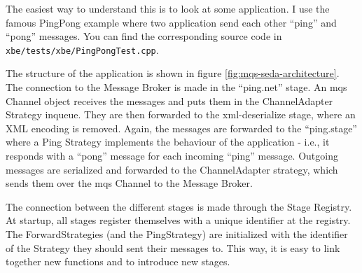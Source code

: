 \documentclass[11pt]{article}
\begin{document}
The easiest way to understand this is to look at some application. I
use the famous PingPong example where two application send each other
"`ping"' and "`pong"' messages. You can find the corresponding source
code in \verb|xbe/tests/xbe/PingPongTest.cpp|. 

The structure of the application is shown in figure
\ref{fig:mqs-seda-architecture}. The connection to the Message Broker is
made in the "`ping.net"' stage. An mqs Channel object receives the
messages and puts them in the ChannelAdapter Strategy inqueue. They are
then forwarded to the xml-deserialize stage, where an XML encoding is
removed. Again, the messages are forwarded to the "`ping.stage"' where a
Ping Strategy implements the behaviour of the application - i.e., it
responds with a "`pong"' message for each incoming "`ping"' message.
Outgoing messages are serialized and forwarded to the ChannelAdapter
strategy, which sends them over the mqs Channel to the Message Broker.

The connection between the different stages is made through the Stage
Registry. At startup, all stages register themselves with a unique
identifier at the registry. The ForwardStrategies (and the PingStrategy)
are initialized with the identifier of the Strategy they should sent
their messages to. This way, it is easy to link together new functions
and to introduce new stages.
\end{document}
